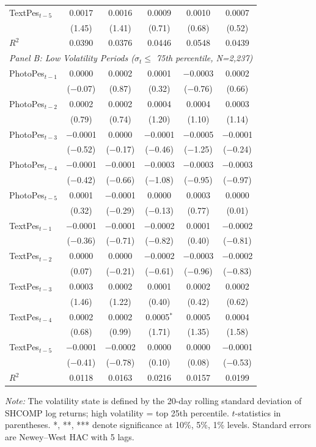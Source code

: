 \documentclass[AER]{AEA}
\begin{document}
\begin{table}[p]
\begin{tabular}{lccccc}
    TextPes$_{t-5}$ & 0.0017 & 0.0016 & 0.0009 & 0.0010 & 0.0007 \\
     & (1.45) & (1.41) & (0.71) & (0.68) & (0.52) \\
    $R^2$ & 0.0390 & 0.0376 & 0.0446 & 0.0548 & 0.0439 \\
    \midrule
    \multicolumn{6}{l}{\textit{Panel B: Low Volatility Periods ($\sigma_t \leq$ 75th percentile, N=2{,}237)}} \\
    \midrule
    PhotoPes$_{t-1}$ & 0.0000 & 0.0002 & 0.0001 & $-$0.0003 & 0.0002 \\
     & ($-$0.07) & (0.87) & (0.32) & ($-$0.76) & (0.66) \\
    PhotoPes$_{t-2}$ & 0.0002 & 0.0002 & 0.0004 & 0.0004 & 0.0003 \\
     & (0.79) & (0.74) & (1.20) & (1.10) & (1.14) \\
    PhotoPes$_{t-3}$ & $-$0.0001 & 0.0000 & $-$0.0001 & $-$0.0005 & $-$0.0001 \\
     & ($-$0.52) & ($-$0.17) & ($-$0.46) & ($-$1.25) & ($-$0.24) \\
    PhotoPes$_{t-4}$ & $-$0.0001 & $-$0.0001 & $-$0.0003 & $-$0.0003 & $-$0.0003 \\
     & ($-$0.42) & ($-$0.66) & ($-$1.08) & ($-$0.95) & ($-$0.97) \\
    PhotoPes$_{t-5}$ & 0.0001 & $-$0.0001 & 0.0000 & 0.0003 & 0.0000 \\
     & (0.32) & ($-$0.29) & ($-$0.13) & (0.77) & (0.01) \\
    \midrule
    TextPes$_{t-1}$ & $-$0.0001 & $-$0.0001 & $-$0.0002 & 0.0001 & $-$0.0002 \\
     & ($-$0.36) & ($-$0.71) & ($-$0.82) & (0.40) & ($-$0.81) \\
    TextPes$_{t-2}$ & 0.0000 & 0.0000 & $-$0.0002 & $-$0.0003 & $-$0.0002 \\
     & (0.07) & ($-$0.21) & ($-$0.61) & ($-$0.96) & ($-$0.83) \\
    TextPes$_{t-3}$ & 0.0003 & 0.0002 & 0.0001 & 0.0002 & 0.0002 \\
     & (1.46) & (1.22) & (0.40) & (0.42) & (0.62) \\
    TextPes$_{t-4}$ & 0.0002 & 0.0002 & 0.0005$^{*}$ & 0.0005 & 0.0004 \\
     & (0.68) & (0.99) & (1.71) & (1.35) & (1.58) \\
    TextPes$_{t-5}$ & $-$0.0001 & $-$0.0002 & 0.0000 & 0.0000 & $-$0.0001 \\
     & ($-$0.41) & ($-$0.78) & (0.10) & (0.08) & ($-$0.53) \\
    $R^2$ & 0.0118 & 0.0163 & 0.0216 & 0.0157 & 0.0199 \\
    \bottomrule
    \end{tabular}

    \vspace{0.2cm}
    \footnotesize
    \textit{Note:} The volatility state is defined by the 20-day rolling standard deviation of SHCOMP log returns; high volatility = top 25th percentile. $t$-statistics in parentheses. *, **, *** denote significance at 10\%, 5\%, 1\% levels. Standard errors are Newey--West HAC with 5 lags.
\end{table}
\end{document}
